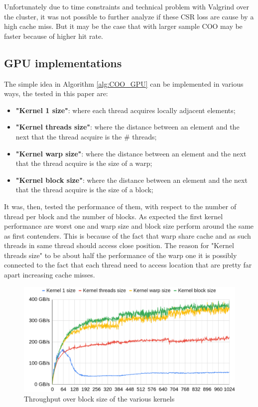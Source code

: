 \documentclass[conference]{IEEEtran}
\begin{document}
\FloatBarrier
Unfortunately due to time constraints and technical problem with Valgrind over the cluster, it was not possible to further analyze if these CSR loss are cause by a high cache miss. But it may be the case that with larger sample COO may be faster because of higher hit rate.

\subsection{GPU implementations}
The simple idea in Algorithm \ref{alg:COO_GPU} can be implemented in various ways, the tested in this paper are:
\begin{itemize}
	\item \textbf{"Kernel 1 size"}: where each thread acquires locally adjacent elements;
	\item \textbf{"Kernel threads size"}: where the distance between an element and the next that the thread acquire is the \# threads;
	\item \textbf{"Kernel warp size"}: where the distance between an element and the next that the thread acquire is the size of a warp;
	\item \textbf{"Kernel block size"}: where the distance between an element and the next that the thread acquire is the size of a block;
\end{itemize}

It was, then, tested the performance of them, with respect to the number of thread per block and the number of blocks. As expected the first kernel performance are worst one and warp size and block size perform around the same as first contenders. This is because of the fact that warp share cache and as such threads in same thread should access close position. The reason for "Kernel threads size" to be about half the performance of the warp one it is possibly connected to the fact that each thread need to access location that are pretty far apart increasing cache misses.

\begin{figure}[hbt!]
	\centering
	\includegraphics[width=1\linewidth]{data_images/Gb_for_size_block}
	\caption{Throughput over block size of the various kernels }
	\label{fig:gbforsizeblock}
\end{figure}
\end{document}
